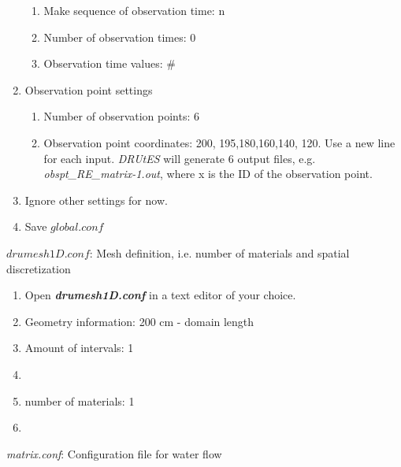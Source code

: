 \begin{enumerate}
\begin{enumerate}
\item Make sequence of observation time: n
\item Number of observation times: 0
\item Observation time values: \#
\end{enumerate}
\item Observation point settings \begin{enumerate}
\item Number of observation points: 6 
\item Observation point coordinates: 200, 195,180,160,140, 120. Use a new line for each input. \textit{DRUtES} will generate 6 output files, e.g. \textit{obspt\_RE\_matrix-1.out}, where x is the ID of the observation point. 
\end{enumerate}
\item Ignore other settings for now. 
\item Save $global.conf$
\end{enumerate}


$drumesh1D.conf$: Mesh definition, i.e. number of materials and spatial discretization
\begin{enumerate}
\item Open \textbf{\emph{drumesh1D.conf}} in a text editor of your choice. 
\item Geometry information: 200 cm - domain length
\item Amount of intervals: 1
\item
{}
\item number of materials: 1
\item {}
\end{enumerate}

\emph{matrix.conf}: Configuration file for water flow 



